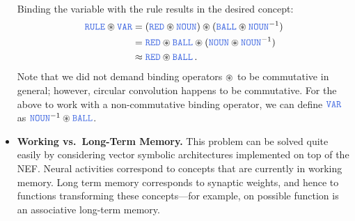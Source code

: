 \documentclass[10pt,letterpaper,oneside]{article}
\begin{document}
\begin{itemize}
\begin{align*}
	\end{align*}
	Binding the variable with the rule results in the desired concept:
	\begin{align*}
		\Obj{RULE} \CC \Obj{VAR} &= ( \Obj{RED} \CC \Obj{NOUN} ) \CC ( \Obj{BALL} \CC \Obj{NOUN}^{-1} ) \\
		                         &= \Obj{RED} \CC \Obj{BALL} \CC ( \Obj{NOUN} \CC \Obj{NOUN}^{-1} ) \\
		                         &\approx \Obj{RED} \CC \Obj{BALL} \,.
	\end{align*}
	Note that we did not demand binding operators $\circledast$ to be commutative in general; however, circular convolution happens to be commutative. For the above to work with a non-commutative binding operator, we can define $\Obj{VAR}$ as $\Obj{NOUN}^{-1} \CC \Obj{BALL}$.
	\item \textbf{Working vs.~Long-Term Memory.} This problem can be solved quite easily by considering vector symbolic architectures implemented on top of the NEF. Neural activities correspond to concepts that are currently in working memory. Long term memory corresponds to synaptic weights, and hence to functions transforming these concepts---for example, on possible function is an associative long-term memory.
\end{itemize}

\printbibliography
\end{document}
